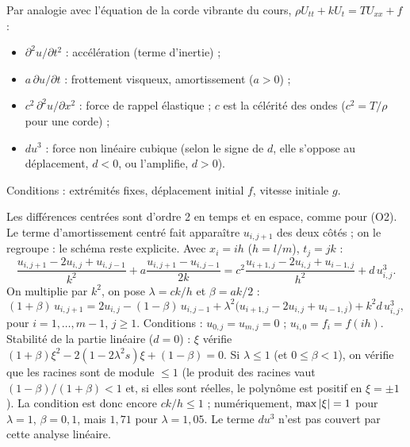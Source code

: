  Par analogie avec l'équation de la
corde vibrante du cours,
$\rho U_{tt} + kU_t = TU_{xx} + f$ :
\begin{itemize}
  \item $\partial^2u/\partial t^2$ : accélération (terme d'inertie) ;
  \item $a\,\partial u/\partial t$ : frottement visqueux, amortissement ($a > 0$) ;
  \item $c^2\,\partial^2u/\partial x^2$ : force de rappel élastique ; $c$ est la
        célérité des ondes ($c^2 = T/\rho$ pour une corde) ;
  \item $du^3$ : force non linéaire cubique (selon le signe de $d$, elle
        s'oppose au déplacement, $d < 0$, ou l'amplifie, $d > 0$).
\end{itemize}
Conditions : extrémités fixes, déplacement initial $f$, vitesse initiale $g$.

\Pourquoi Les différences centrées sont d'ordre 2 en temps et en espace, comme
pour (O2). Le terme d'amortissement centré fait apparaître $u_{i,j+1}$ des deux
côtés ; on le regroupe : le schéma reste explicite.
\Etapes
{} Avec $x_i = ih$ ($h = l/m$), $t_j = jk$ :
\[
  \frac{u_{i,j+1} - 2u_{i,j} + u_{i,j-1}}{k^2} + a\frac{u_{i,j+1} - u_{i,j-1}}{2k}
  = c^2\frac{u_{i+1,j} - 2u_{i,j} + u_{i-1,j}}{h^2} + d\,u_{i,j}^3 .
\]
 On multiplie par $k^2$, on pose $\lambda = ck/h$ et $\beta = ak/2$ :
\[
  (1 + \beta)\,u_{i,j+1} = 2u_{i,j} - (1 - \beta)\,u_{i,j-1}
  + \lambda^2\bigl(u_{i+1,j} - 2u_{i,j} + u_{i-1,j}\bigr) + k^2d\,u_{i,j}^3 ,
\]
pour $i = 1, \dots, m-1$, $j \ge 1$.
 Conditions : $u_{0,j} = u_{m,j} = 0$ ; $u_{i,0} = f_i = f(ih)$.
 Stabilité de la partie linéaire ($d = 0$) : $\xi$ vérifie
$(1+\beta)\xi^2 - 2(1 - 2\lambda^2s)\xi + (1 - \beta) = 0$. Si
$\lambda \le 1$ (et $0 \le \beta < 1$), on vérifie que les racines sont de module
$\le 1$ (le produit des racines vaut $(1-\beta)/(1+\beta) < 1$ et, si elles sont
réelles, le polynôme est positif en $\xi = \pm1$). La condition est donc encore
$ck/h \le 1$ ; numériquement, $\max\left|\xi\right| = 1$ pour $\lambda = 1$, $\beta = 0{,}1$,
mais $1{,}71$ pour $\lambda = 1{,}05$. Le terme $du^3$ n'est pas couvert par cette
analyse linéaire.


